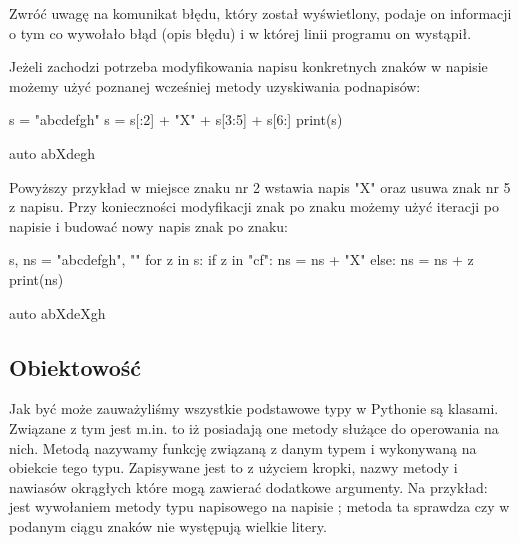 Zwróć uwagę na komunikat błędu, który został wyświetlony, podaje on informacji o tym co wywołało błąd (opis błędu) i w  której linii programu on wystąpił.


Jeżeli zachodzi potrzeba modyfikowania napisu konkretnych znaków w napisie możemy użyć poznanej wcześniej metody uzyskiwania podnapisów:

\begin{CodeFrame}[python]{0.50\textwidth}
s = "abcdefgh"
s = s[:2] + "X" + s[3:5] + s[6:]
print(s)
\end{CodeFrame}
\begin{CodeFrame}{auto}
abXdegh
\end{CodeFrame}

Powyższy przykład w miejsce znaku nr 2 wstawia napis "X" oraz usuwa znak nr 5 z napisu.
Przy konieczności modyfikacji znak po znaku możemy użyć iteracji po napisie i budować nowy napis znak po znaku:

\begin{CodeFrame}[python]{0.50\textwidth}
s, ns = "abcdefgh", ""
for z in s:
    if z in "cf":
        ns = ns + "X"
    else:
        ns = ns + z
print(ns)
\end{CodeFrame}
\begin{CodeFrame}{auto}
abXdeXgh
\end{CodeFrame}

\subsection{Obiektowość}

Jak być może zauważyliśmy wszystkie podstawowe typy w Pythonie są klasami. Związane z tym jest m.in. to iż posiadają one metody służące do operowania na nich.
Metodą nazywamy funkcję związaną z danym typem i wykonywaną na obiekcie tego typu.
Zapisywane jest to z użyciem kropki, nazwy metody i nawiasów okrągłych które mogą zawierać dodatkowe argumenty.
Na przykład: \python{"aącd".islower()} jest wywołaniem metody \python{islower} typu napisowego na napisie ; metoda ta sprawdza czy w podanym ciągu znaków nie występują wielkie litery.

